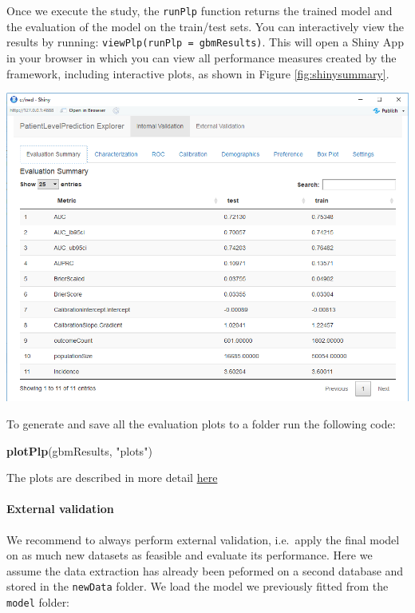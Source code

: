 \documentclass[11pt]{book}
\newenvironment{Shaded}{\begin{snugshade}}{\end{snugshade}}
\newcommand{\KeywordTok}[1]{\textcolor[rgb]{0.13,0.29,0.53}{\textbf{#1}}}
\newcommand{\StringTok}[1]{\textcolor[rgb]{0.31,0.60,0.02}{#1}}
\newcommand{\NormalTok}[1]{#1}
\let\oldparagraph\paragraph
\renewcommand{\paragraph}[1]{\oldparagraph{#1}\mbox{}}
\begin{document}
Once we execute the study, the \texttt{runPlp} function returns the
trained model and the evaluation of the model on the train/test sets.
You can interactively view the results by running:
\texttt{viewPlp(runPlp\ =\ gbmResults)}. This will open a Shiny App in
your browser in which you can view all performance measures created by
the framework, including interactive plots, as shown in Figure
\ref{fig:shinysummary}.

\includegraphics[width=1\linewidth]{images/PatientLevelPrediction/shinysummary}

To generate and save all the evaluation plots to a folder run the
following code:

\begin{Shaded}
\begin{Highlighting}[]
\KeywordTok{plotPlp}\NormalTok{(gbmResults, }\StringTok{"plots"}\NormalTok{)}
\end{Highlighting}
\end{Shaded}

The plots are described in more detail
\protect\hyperlink{performance}{here}

\paragraph{External validation}\label{external-validation}

We recommend to always perform external validation, i.e.~apply the final
model on as much new datasets as feasible and evaluate its performance.
Here we assume the data extraction has already been peformed on a second
database and stored in the \texttt{newData} folder. We load the model we
previously fitted from the \texttt{model} folder:
\end{document}
